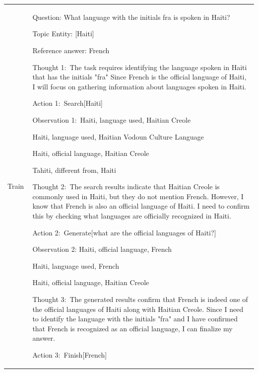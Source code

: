 \renewcommand{\arraystretch}{1.5}
\begin{table}[ht!]
\centering
\begin{tabular}{>{\hspace{0pt}}m{0.1\linewidth}|>{\hspace{0pt}}m{0.9\linewidth}} 
\hline
\rowcolor[rgb]{0.9490,0.9490,0.9490} Train     & Question: What language with the initials fra is spoken in Haiti?\par{}Topic Entity: [Haiti]\par{}Reference answer: French\par\null\par{}Thought 1:~The task requires identifying the language spoken in Haiti that has the initials "fra" Since French is the official language of Haiti, I will focus on gathering information about languages spoken in Haiti.\par{}Action 1:~Search[Haiti]\par{}Observation 1:~Haiti, language used, Haitian Creole\par{}Haiti, language used, Haitian Vodoun Culture Language\par{}Haiti, official language, Haitian Creole\par{}Tahiti, different from, Haiti\par\null\par{}Thought 2:~The search results indicate that Haitian Creole is commonly used in Haiti, but they do not mention French. However, I know that French is also an official language of Haiti. I need to confirm this by checking what languages are officially recognized in Haiti.\par{}Action 2:~\textcolor[rgb]{0.7529,0,0}{Generate[what are the official languages of Haiti?]}\par{}Observation 2: \textcolor[rgb]{0.4549,0.7137,0.0078}{Haiti, official language, French}\par{}\textcolor[rgb]{0.4549,0.7137,0.0078}{Haiti, language used, French}\par{}Haiti, official language, Haitian Creole\par\null\par{}Thought 3:~The generated results confirm that French is indeed one of the official languages of Haiti along with Haitian Creole. Since I need to identify the language with the initials "fra" and I have confirmed that French is recognized as an official language, I can finalize my answer.\par{}Action 3:~Finish[French]  \\

\end{tabular}
\end{table}
